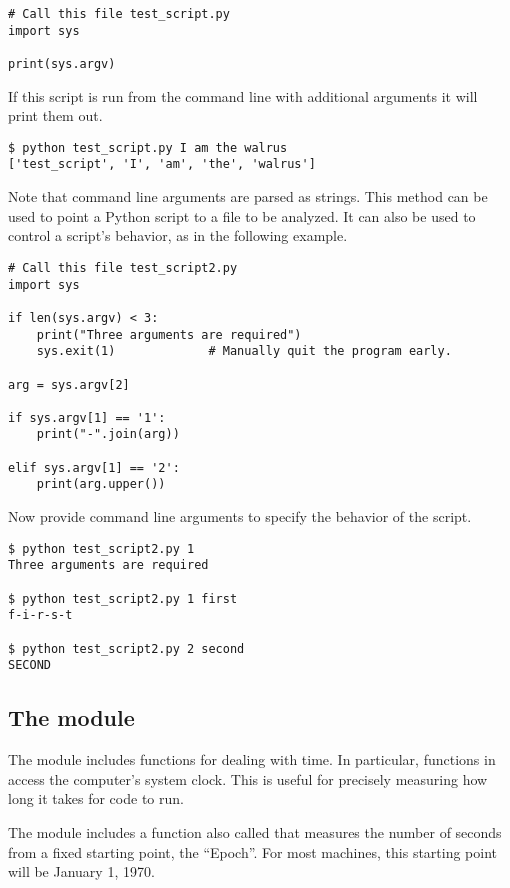 \begin{lstlisting}
# Call this file test_script.py
import sys

print(sys.argv)
\end{lstlisting}

If this script is run from the command line with additional arguments it will print them out.

\begin{lstlisting}
$ python test_script.py I am the walrus
['test_script', 'I', 'am', 'the', 'walrus']
\end{lstlisting}

Note that command line arguments are parsed as strings.
This method can be used to point a Python script to a file to be analyzed.
It can also be used to control a script's behavior, as in the following example.

\begin{lstlisting}
# Call this file test_script2.py
import sys

if len(sys.argv) < 3:
    print("Three arguments are required")
    sys.exit(1)             # Manually quit the program early.

arg = sys.argv[2]

if sys.argv[1] == '1':
    print("-".join(arg))

elif sys.argv[1] == '2':
    print(arg.upper())
\end{lstlisting}

Now provide command line arguments to specify the behavior of the script.

\begin{lstlisting}
$ python test_script2.py 1
Three arguments are required

$ python test_script2.py 1 first
f-i-r-s-t

$ python test_script2.py 2 second
SECOND
\end{lstlisting}

\subsection*{The  module}

The  module includes functions for dealing with time.
In particular, functions in  access the computer's system clock.
This is useful for precisely measuring how long it takes for code to run.

The  module includes a function also called  that measures the number of seconds from a fixed starting point, the ``Epoch''.
For most machines, this starting point will be January 1, 1970.

